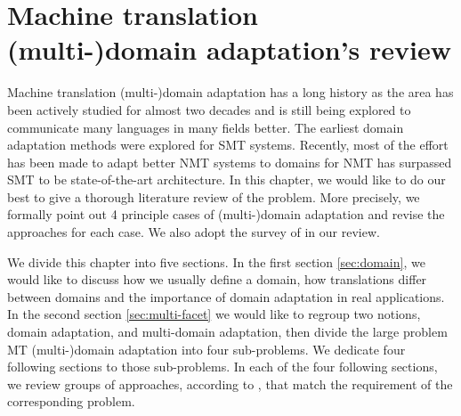\chapter{Machine translation (multi-)domain adaptation's review} \label{chap:revisting}
Machine translation (multi-)domain adaptation has a long history as the area has been actively studied for almost two decades and is still being explored to communicate many languages in many fields better. The earliest domain adaptation methods were explored for SMT systems. Recently, most of the effort has been made to adapt better NMT systems to domains for NMT has surpassed SMT to be state-of-the-art architecture. In this chapter, we would like to do our best to give a thorough literature review of the problem. More precisely, we formally point out 4 principle cases of (multi-)domain adaptation and revise the approaches for each case. We also adopt the survey of \cite{Chu18asurvey} in our review.

We divide this chapter into five sections. In the first section \ref{sec:domain}, we would like to discuss how we usually define a domain, how translations differ between domains and the importance of domain adaptation in real applications. In the second section \ref{sec:multi-facet} we would like to regroup two notions, domain adaptation, and multi-domain adaptation, then divide the large problem MT (multi-)domain adaptation into four sub-problems. We dedicate four following sections to those sub-problems. In each of the four following sections, we review groups of approaches, according to \citet{Chu18survey}, that match the requirement of the corresponding problem.
